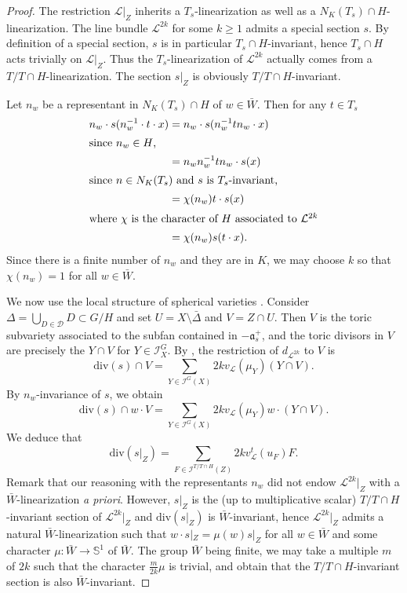 \documentclass{amsart}
\theoremstyle{definition}
\begin{document}
\begin{proof}
The restriction $\mathcal{L}|_Z$ inherits a $T_s$-linearization as well as a 
$N_K(T_s)\cap H$-linearization. 
The line bundle $\mathcal{L}^{2k}$ for some $k\geq 1$ admits a 
special section $s$.
By definition of a special section, $s$ is in particular $T_s\cap H$-invariant, 
hence $T_s\cap H$ acts trivially on $\mathcal{L}|_Z$.
Thus the $T_s$-linearization of $\mathcal{L}^{2k}$ actually comes from a 
$T/T\cap H$-linearization. 
The section $s|_Z$ is obviously $T/T\cap H$-invariant.

Let $n_w$ be a representant in $N_K(T_s)\cap H$ of $w\in \bar{W}$.
Then for any $t\in T_s$ 
\begin{align*}
n_w\cdot s(n_w^{-1}\cdot t\cdot x) &= n_w\cdot s(n_w^{-1}tn_w\cdot x) \\
\intertext{since $n_w\in H$,}
&= n_wn_w^{-1}tn_w\cdot s(x) \\
\intertext{since $n\in N_K(T_s)$ and $s$ is $T_s$-invariant,}
&= \chi(n_w)t\cdot s(x) \\
\intertext{where $\chi$ is the character of $H$ associated to $\mathcal{L}^{2k}$}
&= \chi(n_w) s(t\cdot x).
\end{align*}
Since there is a finite number of $n_w$ and they are in $K$, we may choose 
$k$ so that $\chi(n_w)=1$ for all $w\in \bar{W}$.

We now use the local structure of spherical varieties \cite[Proposition 3.4]{BP87}. 
Consider $\Delta=\bigcup_{D\in\mathcal{D}}D\subset G/H$ and set 
$U=X\setminus \bar{\Delta}$ and $V=Z\cap U$. 
Then $V$ is the toric subvariety associated to the subfan contained 
in $-\mathfrak{a}_s^+$, and the toric divisors in $V$ are precisely the 
$Y\cap V$ for $Y\in \mathcal{I}^G_X$.
By \cite[Section 3.2]{Bri89}, the restriction of $d_{\mathcal{L}^{2k}}$ 
to $V$ is 
\[
\mathrm{div}(s)\cap V= \sum_{Y\in \mathcal{I}^G(X)} 2k v_{\mathcal{L}}(\mu_Y)(Y\cap V).
\]
By $n_w$-invariance of $s$, we obtain 
\[
\mathrm{div}(s)\cap w\cdot V = \sum_{Y\in \mathcal{I}^G(X)} 2k v_{\mathcal{L}}(\mu_Y)w\cdot(Y\cap V).
\]
We deduce that 
\[
\mathrm{div}(s|_Z) = \sum_{F\in \mathcal{I}^{T/T\cap H}(Z)} 2k v_{\mathcal{L}}^t(u_F)F.
\] 
Remark that our reasoning with the representants $n_w$ did not endow $\mathcal{L}^{2k}|_Z$
with a $\bar{W}$-linearization \emph{a priori}. 
However, $s|_Z$ is the (up to multiplicative scalar) $T/T\cap H$-invariant section of $\mathcal{L}^{2k}|_Z$
and $\mathrm{div}(s|_Z)$ is $\bar{W}$-invariant, hence $\mathcal{L}^{2k}|_Z$ admits a 
natural $\bar{W}$-linearization such that $w\cdot s|_Z= \mu(w) s|_Z$ for all $w\in \bar{W}$ and 
some character $\mu:\bar{W}\rightarrow \mathbb{S}^1$ of $\bar{W}$. The group $\bar{W}$ being 
finite, we may take a multiple $m$ of $2k$ such that the character $\frac{m}{2k}\mu$ is trivial, 
and obtain that the $T/T\cap H$-invariant section is also $\bar{W}$-invariant. 
\end{proof}
\end{document}
